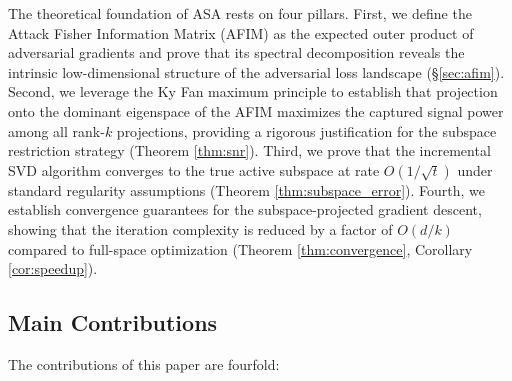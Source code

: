 \documentclass[preprint,12pt]{elsarticle}
\begin{document}
The theoretical foundation of ASA rests on four pillars. First, we define the Attack Fisher Information Matrix (AFIM) as the expected outer product of adversarial gradients and prove that its spectral decomposition reveals the intrinsic low-dimensional structure of the adversarial loss landscape (\S\ref{sec:afim}). Second, we leverage the Ky Fan maximum principle \cite{fan1949theorem} to establish that projection onto the dominant eigenspace of the AFIM maximizes the captured signal power among all rank-$k$ projections, providing a rigorous justification for the subspace restriction strategy (Theorem \ref{thm:snr}). Third, we prove that the incremental SVD algorithm converges to the true active subspace at rate $O(1/\sqrt{t})$ under standard regularity assumptions (Theorem \ref{thm:subspace_error}). Fourth, we establish convergence guarantees for the subspace-projected gradient descent, showing that the iteration complexity is reduced by a factor of $O(d/k)$ compared to full-space optimization (Theorem \ref{thm:convergence}, Corollary \ref{cor:speedup}).

\subsection{Main Contributions}
\label{sec:contributions}

The contributions of this paper are fourfold:
\end{document}
